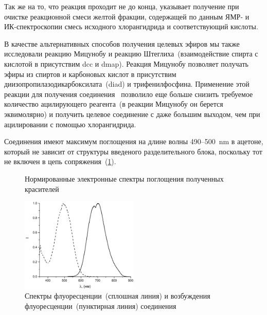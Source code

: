 Так же на то, что реакция проходит не до конца, указывает получение при очистке реакционной смеси желтой фракции, содержащей по данным ЯМР- и ИК-спектроскопии смесь исходного хлорангидрида и соответствующий кислоты.

В качестве альтернативных способов получения целевых эфиров мы также исследовали реакцию Мицунобу и реакцию Штеглиха~(взаимодействие спирта с кислотой в присутствим \ac{dcc} и \ac{dmap}). Реакция Мицунобу позволяет получать эфиры из спиртов и карбоновых кислот в присутствим диизопропилазодикарбоксилата~(\ac{diad}) и трифенилфосфина. Применение этой реакции для получения соединения~ позволило еще больше снизить требуемое количество ацилирующего реагента~(в реакции Мицунобу он берется эквимолярно) и получить целевое соединение с даже большим выходом, чем при ацилировании с помощью хлорангидрида.

Соединения имеют максимум поглощения на длине волны 490--\SI{500}{\nano\metre} в ацетоне, который не зависит от структуры введеного разделительного блока, поскольку тот не включен в цепь сопряжения~(\ref{fig:1OH-UV}).
\begin{figure}
    \centering
    \caption{Нормированные электронные спектры поглощения полученных красителей}
    \label{fig:1OH-UV}
\end{figure}

\begin{figure}
    \centering
    \includegraphics[width = 0.5\textwidth]{sections/results/img/Graph3 - Copy.pdf}
    \caption{Спектры флуоресценции~(сплошная линия) и возбуждения флуоресценции~(пунктирная линия) соединения~}
\end{figure}

